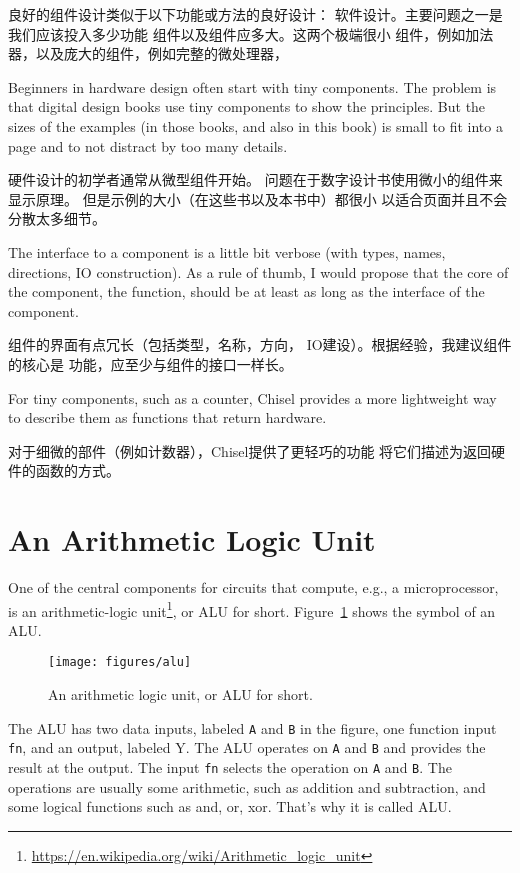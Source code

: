 \documentclass[%
    10pt,
    headinclude, footexclude,
    openright, %
    notitlepage,
    cleardoubleempty,
    headsepline,
    pointlessnumbers,
    bibtotoc, idxtotoc,
    ]{scrbook}
\newcommand{\code}[1]{{\small{\texttt{#1}}}}
\newcommand{\scale}{0.7}
\newcommand{\myref}[2]{\href{#1}{#2}}
\renewcommand{\myref}[2]{{#2}{\footnote{\url{#1}}}}
\begin{document}
良好的组件设计类似于以下功能或方法的良好设计：
软件设计。主要问题之一是我们应该投入多少功能
组件以及组件应多大。这两个极端很小
组件，例如加法器，以及庞大的组件，例如完整的微处理器，

Beginners in hardware design often start with tiny components.
The problem is that digital design books use tiny components to show the principles.
But the sizes of the examples (in those books, and also in this book) is small
to fit into a page and to not distract by too many details.

硬件设计的初学者通常从微型组件开始。
问题在于数字设计书使用微小的组件来显示原理。
但是示例的大小（在这些书以及本书中）都很小
以适合页面并且不会分散太多细节。

The interface to a component is a little bit verbose (with types, names, directions,
IO construction). As a rule of thumb, I would propose that the core of the component,
the function, should be at least as long as the interface of the component.


组件的界面有点冗长（包括类型，名称，方向，
IO建设）。根据经验，我建议组件的核心是
功能，应至少与组件的接口一样长。

For tiny components, such as a counter, Chisel provides a more lightweight
way to describe them as functions that return hardware.


对于细微的部件（例如计数器），Chisel提供了更轻巧的功能
将它们描述为返回硬件的函数的方式。


\section{An Arithmetic Logic Unit}

One of the central components for circuits that compute, e.g., a microprocessor, is an
\myref{https://en.wikipedia.org/wiki/Arithmetic_logic_unit}{arithmetic-logic unit},
or ALU for short. Figure~\ref{fig:alu} shows the symbol of an ALU.

\begin{figure}
  \centering
  \texttt{[image: figures/alu]}
  \caption{An arithmetic logic unit, or ALU for short.}
  \label{fig:alu}
\end{figure}

The ALU has two data inputs, labeled \code{A} and \code{B} in the figure, one function input \code{fn},
and an output, labeled {Y}. The ALU operates on \code{A} and \code{B} and provides the result
at the output. The input \code{fn} selects the operation on \code{A} and \code{B}.
The operations are usually some arithmetic, such as addition and subtraction, and some logical
functions such as and, or, xor. That's why it is called ALU.
\end{document}
